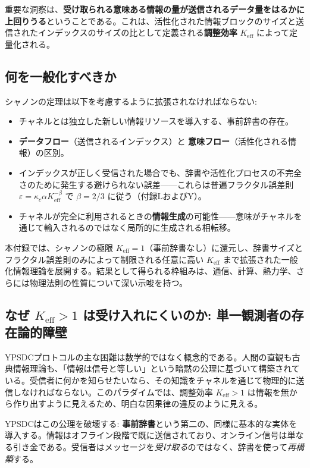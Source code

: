 \documentclass[12pt,a4paper]{article}
\theoremstyle{definition}
\theoremstyle{remark}
\newcommand{\Keff}{K_{\mathrm{eff}}}
\begin{document}
	重要な洞察は、\textbf{受け取られる意味ある情報の量が送信されるデータ量をはるかに上回りうる}ということである。これは、活性化された情報ブロックのサイズと送信されたインデックスのサイズの比として定義される\textbf{調整効率} $\Keff$ によって定量化される。
	
	\subsection{何を一般化すべきか}
	
	シャノンの定理は以下を考慮するように拡張されなければならない:
	\begin{itemize}
		\item チャネルとは独立した新しい情報リソースを導入する、事前辞書の存在。
		\item \textbf{データフロー}（送信されるインデックス）と \textbf{意味フロー}（活性化される情報）の区別。
		\item インデックスが正しく受信された場合でも、辞書や活性化プロセスの不完全さのために発生する避けられない誤差——これらは普遍フラクタル誤差則 $\varepsilon = \kappa_c\alpha K_{\mathrm{eff}}^{-\beta}$ で $\beta=2/3$ に従う（付録LおよびY）。
		\item チャネルが完全に利用されるときの\textbf{情報生成}の可能性——意味がチャネルを通じて輸入されるのではなく局所的に生成される相転移。
	\end{itemize}
	
	本付録では、シャノンの極限 $\Keff = 1$（事前辞書なし）に還元し、辞書サイズとフラクタル誤差則のみによって制限される任意に高い $\Keff$ まで拡張された一般化情報理論を展開する。結果として得られる枠組みは、通信、計算、熱力学、さらには物理法則の性質について深い示唆を持つ。
	
	\subsection{なぜ \(K_{\mathrm{eff}} > 1\) は受け入れにくいのか: 単一観測者の存在論的障壁}
	
	YPSDCプロトコルの主な困難は数学的ではなく概念的である。人間の直観も古典情報理論も、「情報は信号と等しい」という暗黙の公理に基づいて構築されている。受信者に何かを知らせたいなら、その知識をチャネルを通じて物理的に送信しなければならない。このパラダイムでは、調整効率 \(K_{\mathrm{eff}} > 1\) は情報を無から作り出すように見えるため、明白な因果律の違反のように見える。
	
	YPSDCはこの公理を破壊する: \textbf{事前辞書}という第二の、同様に基本的な実体を導入する。情報はオフライン段階で既に送信されており、オンライン信号は単なる引き金である。受信者はメッセージを\emph{受け取る}のではなく、辞書を使って\emph{再構築}する。
	
\end{document}
